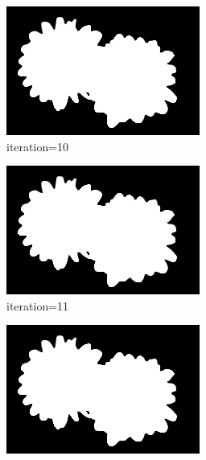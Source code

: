 \documentclass{article}
\begin{document}
\begin{figure}[t]
\begin{subfigure}[t]{0.19\textwidth}
\includegraphics[width=\textwidth]{./images/marginals_iter_10.png}
\vspace{-0.6cm}
\caption{iteration=10}
\end{subfigure}
\begin{subfigure}[t]{0.19\textwidth}
\centering
\includegraphics[width=\textwidth]{./images/marginals_iter_11.png}
\vspace{-0.6cm}
\caption{iteration=11}
\end{subfigure}
\begin{subfigure}[t]{0.19\textwidth}
\centering
\includegraphics[width=\textwidth]{./images/marginals_iter_12.png}

\end{subfigure}
\end{figure}
\end{document}
